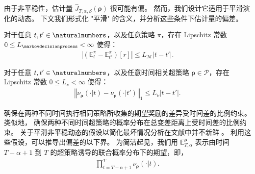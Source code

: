 由于非平稳性，估计量 $\widehat{J}_{T,\alpha,\beta}(\boldsymbol\rho)$ 很可能有偏。
然而，我们设计它适用于平滑演化的动态。
下文我们形式化 "平滑" 的含义，并分析这些条件下估计量的偏差。

\begin{ass}[平滑非平稳环境]
\label{ass:sce}
对于任意 $t,t' \in \naturalnumbers$，以及任意策略 $\pi$，存在 Lipschitz 常数 $0 \le L_{\markovdecisionprocess} < \infty$ 使得：
\begin{align*}
    \left\vert  \left(\mathbb{E}_{t}^{\pi}-\mathbb{E}_{t'}^{\pi} \right)\left[ r \right] \right\vert  \le L_{\mathcal{M}} \lvert t - t'\rvert.
\end{align*}
\end{ass}
\begin{ass}[平滑非平稳超策略]
\label{ass:sch}
对于任意 $t,t' \in \naturalnumbers$，以及任意时间相关超策略 $\boldsymbol\rho \in \mathcal{P}$，存在 Lipschitz 常数 $0 \le L_{\nu} < \infty$ 使得：
\begin{align*}
    \left\Vert  \nu_{\boldsymbol\rho}(\cdot\vert t) - \nu_{\boldsymbol\rho}(\cdot\vert t') \right\Vert _1 \le L_{\nu} \lvert t - t'\rvert.
\end{align*}
\end{ass}

 确保在两种不同时间执行相同策略所收集的期望奖励的差异受时间差的比例约束。
类似地， 确保两种不同时间超策略的概率分布在总变差距离上受时间差的比例约束。
关于平滑非平稳动态的假设以简化最坏情况分析在文献中并不新鲜 \cite{lecarpentier2019non}。
利用这些假设，可以推导出偏差的以下界。
为简洁起见，我们用 $\mathbb{E}_{T,\alpha}^{\boldsymbol\rho}$ 表示由时间 $T-\alpha+1$ 到 $T$ 的超策略诱导的联合概率分布下的期望，即，
\begin{align}
\label{eq:joint_hyper_pol}
    \prod_{t=T-\alpha+1}^{T} \nu_{\boldsymbol\rho}(\cdot\vert t).
\end{align}


